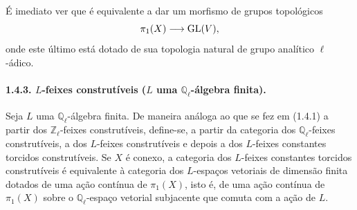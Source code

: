 É imediato ver que é equivalente a dar um morfismo de grupos topológicos
\[
\pi_1(X)\longrightarrow \operatorname{GL}(V),
\]
onde este último está dotado de sua topologia natural de grupo analítico \(\ell\)-ádico.

\paragraph{1.4.3. \(L\)-feixes construtíveis (\(L\) uma \(\mathbb Q_\ell\)-álgebra finita).}
Seja \(L\) uma \(\mathbb Q_\ell\)-álgebra finita. De maneira análoga ao que se fez em (1.4.1) a partir dos \(\mathbb Z_\ell\)-feixes construtíveis, define-se, a partir da categoria dos \(\mathbb Q_\ell\)-feixes construtíveis, a dos \(L\)-feixes construtíveis e depois a dos \(L\)-feixes constantes torcidos construtíveis. Se \(X\) é conexo, a categoria dos \(L\)-feixes constantes torcidos construtíveis é equivalente à categoria dos \(L\)-espaços vetoriais de dimensão finita dotados de uma ação contínua de \(\pi_1(X)\), isto é, de uma ação contínua de \(\pi_1(X)\) sobre o \(\mathbb Q_\ell\)-espaço vetorial subjacente que comuta com a ação de \(L\).

